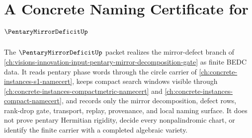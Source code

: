 \chapter{A Concrete Naming Certificate for $\PentaryMirrorDeficitUp$}
\label{ch:concrete-instances-pentary-mirror-deficit-namecert}

The $\PentaryMirrorDeficitUp$ packet realizes the mirror-defect branch of \autoref{ch:visions-innovation-input-pentary-mirror-decomposition-gate} as finite BEDC data. It reads pentary phase words through the circle carrier of \autoref{ch:concrete-instances-s1-namecert}, keeps compact search windows visible through \autoref{ch:concrete-instances-compactmetric-namecert} and \autoref{ch:concrete-instances-compact-namecert}, and records only the mirror decomposition, defect rows, rank-drop gate, transport, replay, provenance, and local naming surface. It does not prove pentary Hermitian rigidity, decide every nonpalindromic chart, or identify the finite carrier with a completed algebraic variety.

